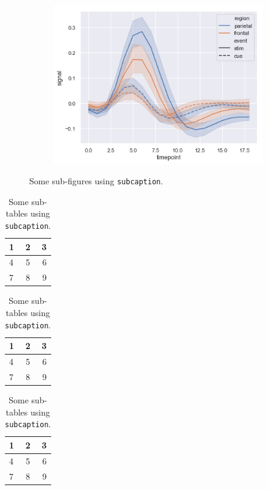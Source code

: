 \documentclass[twocolumn]{article}
\begin{document}
\begin{figure}[t]
\begin{subfigure}[b]{0.32\linewidth}
    \includegraphics[width=\textwidth]{images/errorband_lineplots.png}
    \label{fig:subcaption-subfigure3}
\end{subfigure}
\caption{Some sub-figures using \texttt{subcaption}.}
\label{fig:subcaption-subfigures}
\end{figure}

\begin{table}[t]
\centering
\begin{subtable}[b]{0.32\linewidth}
    \centering
    \begin{tabular}{lcr}
        \hline
        1 & 2 & 3 \\
        \hline
        4 & 5 & 6 \\
        7 & 8 & 9 \\
        \hline
    \end{tabular}
    \label{tab:subcaption-subtable1}
\end{subtable}
\begin{subtable}[b]{0.32\linewidth}
    \centering
    \begin{tabular}{lcr}
        \hline
        1 & 2 & 3 \\
        \hline
        4 & 5 & 6 \\
        7 & 8 & 9 \\
        \hline
    \end{tabular}
    \label{tab:subcaption-subtable2}
\end{subtable}
\begin{subtable}[b]{0.32\linewidth}
    \centering
    \begin{tabular}{lcr}
        \hline
        1 & 2 & 3 \\
        \hline
        4 & 5 & 6 \\
        7 & 8 & 9 \\
        \hline
    \end{tabular}
    \label{tab:subcaption-subtable3}
\end{subtable}
\caption{Some sub-tables using \texttt{subcaption}.}
\label{tab:subcaption-subtables}
\end{table}
\end{document}
